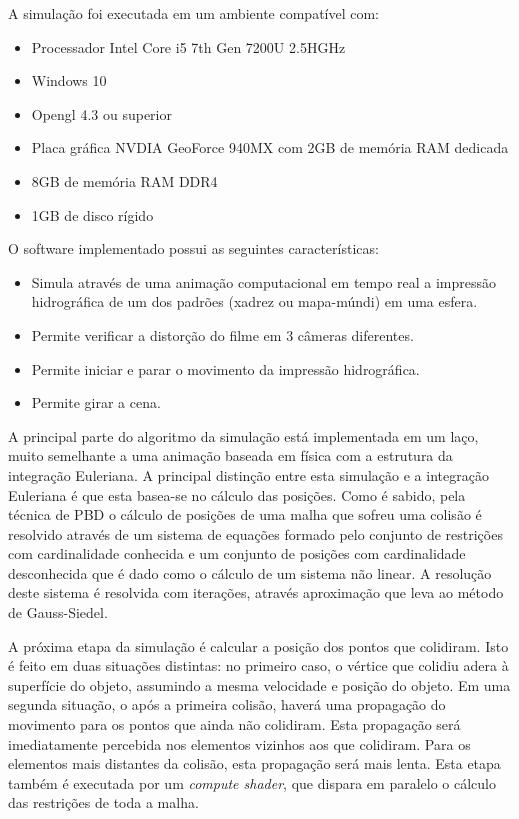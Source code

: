 A simulação foi executada em um ambiente compatível com:

\begin{itemize}
\item Processador Intel Core i5 7th Gen 7200U 2.5HGHz
\item Windows 10
\item Opengl 4.3 ou superior
\item Placa gráfica NVDIA GeoForce 940MX com 2GB de memória RAM dedicada
\item 8GB de memória RAM DDR4
\item 1GB de disco rígido
\end{itemize}

O software implementado possui as seguintes características:

\begin{itemize}
\item Simula através de uma animação computacional em tempo real a impressão hidrográfica de um dos padrões (xadrez ou mapa-múndi) em uma esfera.
\item Permite verificar a distorção do filme em 3 câmeras diferentes.
\item Permite iniciar e parar o movimento da impressão hidrográfica.
\item Permite girar a cena.
\end{itemize}

A principal parte do algoritmo da simulação está implementada em um laço, muito semelhante a uma animação baseada em física com a estrutura da integração Euleriana. A principal distinção entre esta simulação e a integração Euleriana é que esta basea-se no cálculo das posições. Como é sabido, pela técnica de \acs{PBD} o cálculo de posições de uma malha que sofreu uma colisão é resolvido através de um sistema de equações formado pelo conjunto de restrições com cardinalidade conhecida e um conjunto de posições com cardinalidade desconhecida que é dado como o cálculo de um sistema não linear. A resolução deste sistema é resolvida com iterações, através aproximação que leva ao método de Gauss-Siedel.

A próxima etapa da simulação é calcular a posição dos pontos que colidiram. Isto é feito em duas situações distintas: no primeiro caso, o vértice que colidiu adera à superfície do objeto, assumindo a mesma velocidade e posição do objeto. Em uma segunda situação, o após a primeira colisão, haverá uma propagação do movimento para os pontos que ainda não colidiram. Esta propagação será imediatamente percebida nos elementos vizinhos aos que colidiram. Para os elementos mais distantes da colisão, esta propagação será mais lenta. Esta etapa também é executada por um \textit{compute shader}, que dispara em paralelo o cálculo das restrições de toda a malha. 

